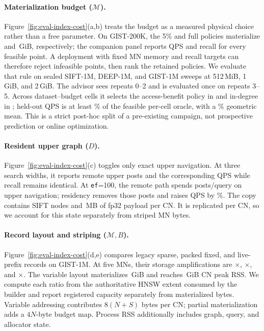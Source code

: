 \documentclass[sigconf,nonacm]{acmart}
\newcommand{\ef}{\texttt{ef}}
\begin{document}
\paragraph{Materialization budget ($\mathcal{M}$).}
Figure~\ref{fig:eval-index-cost}(a,b) treats the budget as a measured physical
choice rather than a free parameter.  On GIST-200K, the 5\% and full policies
materialize \ClaimBudgetFiveGiB{} and \ClaimBudgetFullGiB{}\,GiB, respectively;
the companion panel reports QPS and recall for every feasible point.  A
deployment with fixed MN memory and recall targets can therefore reject
infeasible points, then rank the retained policies.  We evaluate that rule on
sealed SIFT-1M, DEEP-1M, and GIST-1M sweeps at 512\,MiB, 1\,GiB, and 2\,GiB.
The advisor sees repeats 0--2 and is evaluated once on repeats 3--5.  Across
\ClaimAdvisorCellCount{} dataset--budget cells it selects the access-benefit
policy in \ClaimAdvisorBenefitCells{} and in-degree in
\ClaimAdvisorIndegCells{}; held-out QPS is at least
\ClaimAdvisorMinPercent\% of the feasible per-cell oracle, with a
\ClaimAdvisorGeoPercent\% geometric mean.  This is a strict post-hoc split of a
pre-existing campaign, not prospective prediction or online optimization.

\paragraph{Resident upper graph ($D$).}
Figure~\ref{fig:eval-index-cost}(c) toggles only exact upper navigation.  At
three search widths, it reports remote upper posts and the corresponding QPS
while recall remains identical.  At \ef{=}100, the remote path spends
\ClaimResidentRemotePosts{} posts/query on upper navigation; residency removes
those posts and raises QPS by \ClaimResidentQpsGain\%.  The copy contains
\ClaimResidentNodes{} SIFT nodes and \ClaimResidentBytesMB{}\,MB of fp32 payload
per CN.  It is replicated per CN, so we account for this state separately from
striped MN bytes.

\paragraph{Record layout and striping ($\mathcal{M},B$).}
Figure~\ref{fig:eval-index-cost}(d,e) compares legacy sparse, packed fixed, and
live-prefix records on GIST-1M.  At five MNs, their storage amplifications are
\ClaimLegacyAmplification$\times$, \ClaimFixedAmplification$\times$, and
\ClaimVariableAmplification$\times$.  The variable layout materializes
\ClaimVariableSidecarGiB{}\,GiB and reaches \ClaimVariableCnRssGiB{}\,GiB CN
peak RSS.  We compute each ratio from the authoritative HNSW extent consumed by
the builder and report registered capacity separately from materialized bytes.
Variable addressing contributes $8(N+S)$ bytes per CN; partial materialization
adds a $4N$-byte budget map.  Process RSS additionally includes graph, query,
and allocator state.
\end{document}
